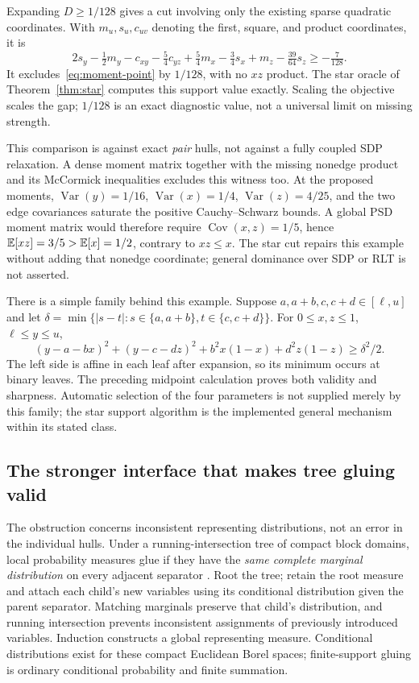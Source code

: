 Expanding $D\ge1/128$ gives a cut involving only the existing sparse
quadratic coordinates. With $m_u,s_u,c_{uv}$ denoting the first,
square, and product coordinates, it is
\begin{equation}\label{eq:overlap-cut}
2s_y-\tfrac12m_y-c_{xy}-\tfrac54c_{yz}
+\tfrac54m_x-\tfrac34s_x+m_z-\tfrac{39}{64}s_z
\ge-\tfrac7{128}.
\end{equation}
It excludes~\eqref{eq:moment-point} by $1/128$, with no $xz$ product.
The star oracle of Theorem~\ref{thm:star} computes this support value
exactly. Scaling the objective scales the gap; $1/128$ is an exact
diagnostic value, not a universal limit on missing strength.

This comparison is against exact \emph{pair} hulls, not against a
fully coupled SDP relaxation. A dense moment matrix together with
the missing nonedge product and its McCormick inequalities excludes
this witness too. At the proposed moments,
$\operatorname{Var}(y)=1/16$, $\operatorname{Var}(x)=1/4$,
$\operatorname{Var}(z)=4/25$, and the two edge covariances saturate
the positive Cauchy--Schwarz bounds. A global PSD moment matrix would
therefore require $\operatorname{Cov}(x,z)=1/5$, hence
$\mathbb E[xz]=3/5>\mathbb E[x]=1/2$, contrary to $xz\le x$. The star cut
repairs this example without adding that nonedge coordinate; general
dominance over SDP or RLT is not asserted.

There is a simple family behind this example. Suppose
$a,a+b,c,c+d\in[\ell,u]$ and let
$\delta=\min\{|s-t|:s\in\{a,a+b\},t\in\{c,c+d\}\}$.
For $0\le x,z\le1$, $\ell\le y\le u$,
\begin{equation}\label{eq:overlap-family}
(y-a-bx)^2+(y-c-dz)^2+b^2x(1-x)+d^2z(1-z)
\ge\delta^2/2.
\end{equation}
The left side is affine in each leaf after expansion, so its minimum
occurs at binary leaves. The preceding midpoint calculation proves
both validity and sharpness. Automatic selection of the four parameters
is not supplied merely by this family; the star support algorithm is
the implemented general mechanism within its stated class.

\subsection{The stronger interface that makes tree gluing valid}

The obstruction concerns inconsistent representing distributions, not
an error in the individual hulls. Under a running-intersection tree of
compact block domains, local probability measures glue if they have
the \emph{same complete marginal distribution} on every adjacent
separator \cite{Lasserre2006}. Root the tree; retain the root measure
and attach each child's new variables using its conditional distribution
given the parent separator. Matching marginals preserve that child's
distribution, and running intersection prevents inconsistent assignments
of previously introduced variables. Induction constructs a global
representing measure. Conditional distributions exist for these compact
Euclidean Borel spaces; finite-support gluing is ordinary conditional
probability and finite summation.

